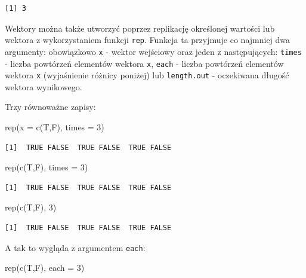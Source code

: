\documentclass[
  letterpaper,
  DIV=11,
  numbers=noendperiod]{scrreprt}
\newenvironment{Shaded}{\begin{snugshade}}{\end{snugshade}}
\newcommand{\AttributeTok}[1]{\textcolor[rgb]{0.40,0.45,0.13}{#1}}
\newcommand{\DecValTok}[1]{\textcolor[rgb]{0.68,0.00,0.00}{#1}}
\newcommand{\FunctionTok}[1]{\textcolor[rgb]{0.28,0.35,0.67}{#1}}
\newcommand{\NormalTok}[1]{\textcolor[rgb]{0.00,0.23,0.31}{#1}}
\begin{document}
\begin{verbatim}
[1] 3
\end{verbatim}

Wektory można także utworzyć poprzez replikację określonej wartości lub
wektora z wykorzystaniem funkcji \texttt{rep}. Funkcja ta przyjmuje co
najmniej dwa argumenty: obowiązkowo \texttt{x} - wektor wejściowy oraz
jeden z następujących: \texttt{times} - liczba powtórzeń elementów
wektora \texttt{x}, \texttt{each} - liczba powtórzeń elementów wektora
\texttt{x} (wyjaśnienie różnicy poniżej) lub \texttt{length.out} -
oczekiwana długość wektora wynikowego.

Trzy równoważne zapisy:

\begin{Shaded}
\begin{Highlighting}[]
\FunctionTok{rep}\NormalTok{(}\AttributeTok{x =} \FunctionTok{c}\NormalTok{(T,F), }\AttributeTok{times =} \DecValTok{3}\NormalTok{)}
\end{Highlighting}
\end{Shaded}

\begin{verbatim}
[1]  TRUE FALSE  TRUE FALSE  TRUE FALSE
\end{verbatim}

\begin{Shaded}
\begin{Highlighting}[]
\FunctionTok{rep}\NormalTok{(}\FunctionTok{c}\NormalTok{(T,F), }\AttributeTok{times =} \DecValTok{3}\NormalTok{)}
\end{Highlighting}
\end{Shaded}

\begin{verbatim}
[1]  TRUE FALSE  TRUE FALSE  TRUE FALSE
\end{verbatim}

\begin{Shaded}
\begin{Highlighting}[]
\FunctionTok{rep}\NormalTok{(}\FunctionTok{c}\NormalTok{(T,F), }\DecValTok{3}\NormalTok{)}
\end{Highlighting}
\end{Shaded}

\begin{verbatim}
[1]  TRUE FALSE  TRUE FALSE  TRUE FALSE
\end{verbatim}

A tak to wygląda z argumentem \texttt{each}:

\begin{Shaded}
\begin{Highlighting}[]
\FunctionTok{rep}\NormalTok{(}\FunctionTok{c}\NormalTok{(T,F), }\AttributeTok{each =} \DecValTok{3}\NormalTok{)}
\end{Highlighting}
\end{Shaded}
\end{document}
